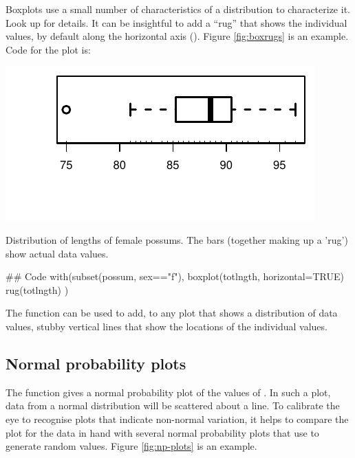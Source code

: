 Boxplots use a small number of characteristics of a distribution to
characterize it. Look up  for details.
It can be insightful to add a ``rug'' that shows the individual values,
by default along the horizontal axis ().
Figure \ref{fig:boxrugs} is an example.  Code for the plot is:
\begin{marginfigure}
\begin{Schunk}


\centerline{\includegraphics[width=\textwidth]{figs/09-boxplot-1} }

\end{Schunk}
\vspace*{-12pt}

\caption{Distribution of lengths of female possums.  The bars
  (together making up a 'rug') show actual data
  values.\label{fig:boxrugs}}
\end{marginfigure}

\begin{Schunk}
\begin{Sinput}
## Code
with(subset(possum, sex=="f"),
     {boxplot(totlngth, horizontal=TRUE)
      rug(totlngth)} )
\end{Sinput}
\end{Schunk}

The function  can be used to add, to any plot that shows a
distribution of data values, stubby vertical lines that show the
locations of the individual values.

\subsection*{Normal probability plots}

The function  gives a normal probability plot of the
values of . In such a plot, data from a normal distribution
will be scattered about a line.  To calibrate the eye to recognise
plots that indicate non-normal variation, it helps to compare the plot
for the data in hand with several normal probability plots that use
 to generate random values.  Figure \ref{fig:np-plots}
is an example.

